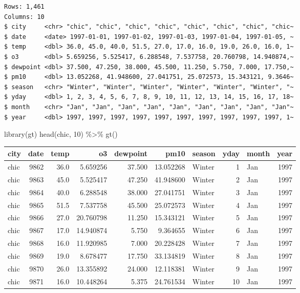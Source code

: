\documentclass[
  letterpaper,
]{scrbook}
\newenvironment{Shaded}{\begin{snugshade}}{\end{snugshade}}
\newcommand{\DecValTok}[1]{\textcolor[rgb]{0.68,0.00,0.00}{#1}}
\newcommand{\FunctionTok}[1]{\textcolor[rgb]{0.28,0.35,0.67}{#1}}
\newcommand{\NormalTok}[1]{\textcolor[rgb]{0.00,0.23,0.31}{#1}}
\newcommand{\SpecialCharTok}[1]{\textcolor[rgb]{0.37,0.37,0.37}{#1}}
\begin{document}
\begin{verbatim}
Rows: 1,461
Columns: 10
$ city     <chr> "chic", "chic", "chic", "chic", "chic", "chic", "chic", "chic~
$ date     <date> 1997-01-01, 1997-01-02, 1997-01-03, 1997-01-04, 1997-01-05, ~
$ temp     <dbl> 36.0, 45.0, 40.0, 51.5, 27.0, 17.0, 16.0, 19.0, 26.0, 16.0, 1~
$ o3       <dbl> 5.659256, 5.525417, 6.288548, 7.537758, 20.760798, 14.940874,~
$ dewpoint <dbl> 37.500, 47.250, 38.000, 45.500, 11.250, 5.750, 7.000, 17.750,~
$ pm10     <dbl> 13.052268, 41.948600, 27.041751, 25.072573, 15.343121, 9.3646~
$ season   <chr> "Winter", "Winter", "Winter", "Winter", "Winter", "Winter", "~
$ yday     <dbl> 1, 2, 3, 4, 5, 6, 7, 8, 9, 10, 11, 12, 13, 14, 15, 16, 17, 18~
$ month    <chr> "Jan", "Jan", "Jan", "Jan", "Jan", "Jan", "Jan", "Jan", "Jan"~
$ year     <dbl> 1997, 1997, 1997, 1997, 1997, 1997, 1997, 1997, 1997, 1997, 1~
\end{verbatim}

\begin{Shaded}
\begin{Highlighting}[]
\FunctionTok{library}\NormalTok{(gt)}
\FunctionTok{head}\NormalTok{(chic, }\DecValTok{10}\NormalTok{) }\SpecialCharTok{\%\textgreater{}\%} \FunctionTok{gt}\NormalTok{()}
\end{Highlighting}
\end{Shaded}

\begin{longtable*}{lrrrrrlrlr}
\toprule
city & date & temp & o3 & dewpoint & pm10 & season & yday & month & year \\ 
\midrule\addlinespace[2.5pt]
chic & 9862 & 36.0 & 5.659256 & 37.500 & 13.052268 & Winter & 1 & Jan & 1997 \\ 
chic & 9863 & 45.0 & 5.525417 & 47.250 & 41.948600 & Winter & 2 & Jan & 1997 \\ 
chic & 9864 & 40.0 & 6.288548 & 38.000 & 27.041751 & Winter & 3 & Jan & 1997 \\ 
chic & 9865 & 51.5 & 7.537758 & 45.500 & 25.072573 & Winter & 4 & Jan & 1997 \\ 
chic & 9866 & 27.0 & 20.760798 & 11.250 & 15.343121 & Winter & 5 & Jan & 1997 \\ 
chic & 9867 & 17.0 & 14.940874 & 5.750 & 9.364655 & Winter & 6 & Jan & 1997 \\ 
chic & 9868 & 16.0 & 11.920985 & 7.000 & 20.228428 & Winter & 7 & Jan & 1997 \\ 
chic & 9869 & 19.0 & 8.678477 & 17.750 & 33.134819 & Winter & 8 & Jan & 1997 \\ 
chic & 9870 & 26.0 & 13.355892 & 24.000 & 12.118381 & Winter & 9 & Jan & 1997 \\ 
chic & 9871 & 16.0 & 10.448264 & 5.375 & 24.761534 & Winter & 10 & Jan & 1997 \\ 
\bottomrule
\end{longtable*}
\end{document}
